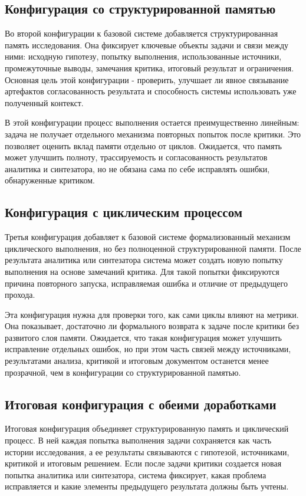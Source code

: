 \subsection{Конфигурация со структурированной памятью}

Во второй конфигурации к базовой системе добавляется структурированная память исследования. Она фиксирует ключевые объекты задачи и связи между ними: исходную гипотезу, попытку выполнения, использованные источники, промежуточные выводы, замечания критика, итоговый результат и ограничения. Основная цель этой конфигурации - проверить, улучшает ли явное связывание артефактов согласованность результата и способность системы использовать уже полученный контекст.

В этой конфигурации процесс выполнения остается преимущественно линейным: задача не получает отдельного механизма повторных попыток после критики. Это позволяет оценить вклад памяти отдельно от циклов. Ожидается, что память может улучшить полноту, трассируемость и согласованность результатов аналитика и синтезатора, но не обязана сама по себе исправлять ошибки, обнаруженные критиком.

\subsection{Конфигурация с циклическим процессом}

Третья конфигурация добавляет к базовой системе формализованный механизм циклического выполнения, но без полноценной структурированной памяти. После результата аналитика или синтезатора система может создать новую попытку выполнения на основе замечаний критика. Для такой попытки фиксируются причина повторного запуска, исправляемая ошибка и отличие от предыдущего прохода.

Эта конфигурация нужна для проверки того, как сами циклы влияют на метрики. Она показывает, достаточно ли формального возврата к задаче после критики без развитого слоя памяти. Ожидается, что такая конфигурация может улучшить исправление отдельных ошибок, но при этом часть связей между источниками, результатами анализа, критикой и итоговым документом останется менее прозрачной, чем в конфигурации со структурированной памятью.

\subsection{Итоговая конфигурация с обеими доработками}

Итоговая конфигурация объединяет структурированную память и циклический процесс. В ней каждая попытка выполнения задачи сохраняется как часть истории исследования, а ее результаты связываются с гипотезой, источниками, критикой и итоговым решением. Если после задачи критики создается новая попытка аналитика или синтезатора, система фиксирует, какая проблема исправляется и какие элементы предыдущего результата должны быть учтены.

